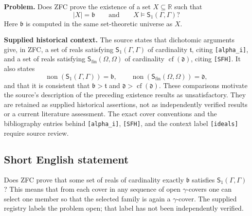 \documentclass[11pt]{article}
\newcommand{\R}{\mathbb{R}}
\begin{document}
\textbf{Problem.} Does ZFC prove the existence of a set \(X\subseteq\R\) such that
\[
|X|=\mathfrak b
\qquad\text{and}\qquad
X\models\mathsf S_1(\Gamma,\Gamma)?
\]
Here \(\mathfrak b\) is computed in the same set-theoretic universe as \(X\).

\textbf{Supplied historical context.} The source states that dichotomic arguments give, in ZFC, a set of reals satisfying \(\mathsf S_1(\Gamma,\Gamma)\) of cardinality \(\mathfrak t\), citing \texttt{[alpha\_i]}, and a set of reals satisfying \(\mathsf S_{\mathrm{fin}}(\Omega,\Omega)\) of cardinality \(\operatorname{cf}(\mathfrak d)\), citing \texttt{[SFH]}. It also states
\[
\operatorname{non}(\mathsf S_1(\Gamma,\Gamma))=\mathfrak b,
\qquad
\operatorname{non}(\mathsf S_{\mathrm{fin}}(\Omega,\Omega))=\mathfrak d,
\]
and that it is consistent that \(\mathfrak b>\mathfrak t\) and \(\mathfrak d>\operatorname{cf}(\mathfrak d)\). These comparisons motivate the source's description of the preceding existence results as unsatisfactory. They are retained as supplied historical assertions, not as independently verified results or a current literature assessment. The exact cover conventions and the bibliography entries behind \texttt{[alpha\_i]}, \texttt{[SFH]}, and the context label \texttt{[ideals]} require source review.
\subsection{Short English statement}
Does ZFC prove that some set of reals of cardinality exactly \(\mathfrak b\) satisfies \(\mathsf S_1(\Gamma,\Gamma)\)? This means that from each cover in any sequence of open \(\gamma\)-covers one can select one member so that the selected family is again a \(\gamma\)-cover. The supplied registry labels the problem open; that label has not been independently verified.
\end{document}
